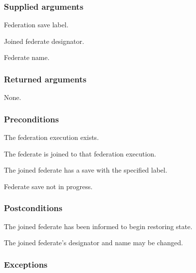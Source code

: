 \subsubsection{Supplied arguments}

\begin{stdalphalist}
    \item Federation save label.
    \item Joined federate designator.
    \item Federate name.
\end{stdalphalist}

\subsubsection{Returned arguments}

\begin{stdalphalist}
    \item None.
\end{stdalphalist}

\clearpage


\subsubsection{Preconditions}

\begin{stdalphalist}
    \item The federation execution exists.
    \item The federate is joined to that federation execution.
    \item The joined federate has a save with the specified label.
    \item Federate save not in progress.
\end{stdalphalist}

\subsubsection{Postconditions}

\begin{stdalphalist}
    \item The joined federate has been informed to begin restoring state.
    \item The joined federate's designator and name may be changed.
\end{stdalphalist}

\subsubsection{Exceptions}

